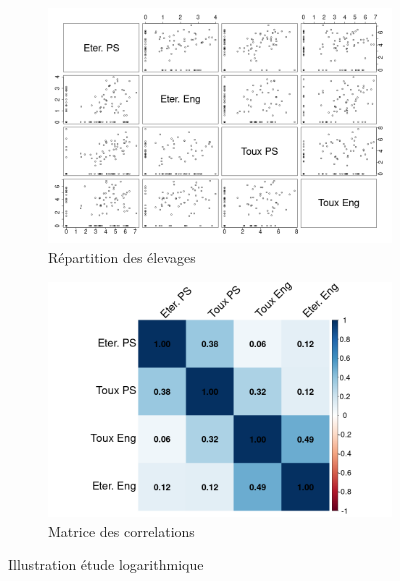 \documentclass{article}
\begin{document}
\begin{figure}[htbp]
    \centering
    \begin{subfigure}[b]{0.49\textwidth}
        \centering
        \includegraphics[width=\textwidth]{img_var_resp/points_corr_log.png}
        \caption{Répartition des élevages}\label{fig:disp_log}
    \end{subfigure}
    \hspace{0.1cm}
    \begin{subfigure}[b]{0.49\textwidth}
        \centering
        \includegraphics[width=\textwidth]{img_var_resp/corrplot_corr_log.png}
        \caption{Matrice des correlations}\label{fig:corr_mat_log}
    \end{subfigure}
    \caption{Illustration étude logarithmique}\label{fig:etu_log}
\end{figure}
\end{document}
